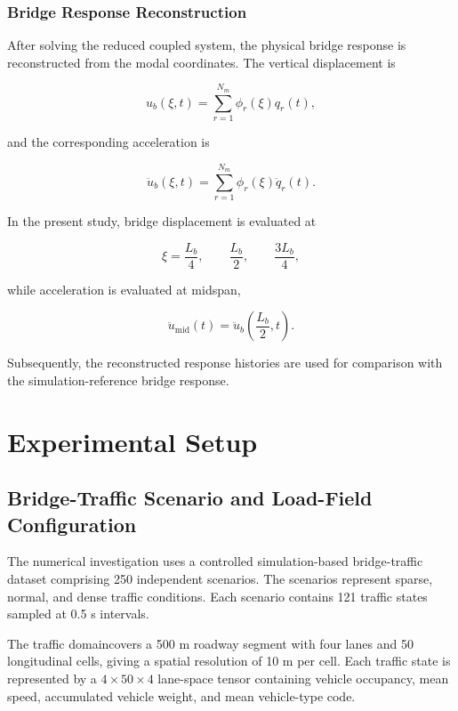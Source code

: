 \documentclass[journal]{IEEEtran}
\begin{document}
\subsubsection{Bridge Response Reconstruction}

After solving the reduced coupled system, the physical bridge
response is reconstructed from the modal coordinates. The vertical displacement
is

\begin{equation}
u_b(\xi,t)
=
\sum_{r=1}^{N_m}
\phi_r(\xi)q_r(t),
\end{equation}

and the corresponding acceleration is

\begin{equation}
\ddot{u}_b(\xi,t)
=
\sum_{r=1}^{N_m}
\phi_r(\xi)\ddot{q}_r(t).
\end{equation}

In the present study, bridge displacement is evaluated at

\begin{equation}
\xi
=
\frac{L_b}{4},
\qquad
\frac{L_b}{2},
\qquad
\frac{3L_b}{4},
\end{equation}

while acceleration is evaluated at midspan,

\begin{equation}
\ddot{u}_{\mathrm{mid}}(t)
=
\ddot{u}_b
\left(
\frac{L_b}{2},t
\right).
\end{equation}

Subsequently, the reconstructed response histories are used for comparison with the simulation-reference bridge response.




\section{Experimental Setup}

\subsection{Bridge-Traffic Scenario and Load-Field Configuration}

The numerical
investigation uses a controlled simulation-based bridge-traffic dataset
comprising 250 independent scenarios. The scenarios represent sparse, normal,
and dense traffic conditions. Each scenario contains 121 traffic states sampled
at 0.5 s intervals.

The traffic domaincovers a 500 m roadway segment with four lanes and 50 longitudinal cells,
giving a spatial resolution of 10 m per cell. Each traffic state is represented
by a $4\times50\times4$ lane-space tensor
containing vehicle occupancy, mean speed, accumulated vehicle weight, and mean
vehicle-type code.
\end{document}
